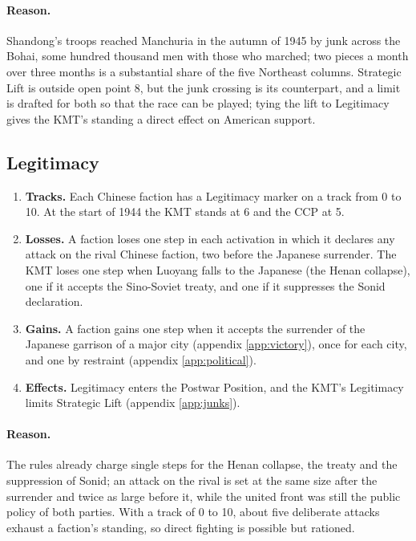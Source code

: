 \documentclass[11pt]{article}
\begin{document}
\paragraph{Reason.} Shandong's troops reached Manchuria in the autumn of 1945 by junk across the Bohai, some hundred thousand men with those who marched; two pieces a month over three months is a substantial share of the five Northeast columns. Strategic Lift is outside open point 8, but the junk crossing is its counterpart, and a limit is drafted for both so that the race can be played; tying the lift to Legitimacy gives the KMT's standing a direct effect on American support.

\subsection{Legitimacy}\label{app:legit}
\draft
\begin{enumerate}
\item \textbf{Tracks.} Each Chinese faction has a Legitimacy marker on a track from 0 to 10. At the start of 1944 the KMT stands at 6 and the CCP at 5.
\item \textbf{Losses.} A faction loses one step in each activation in which it declares any attack on the rival Chinese faction, two before the Japanese surrender. The KMT loses one step when Luoyang falls to the Japanese (the Henan collapse), one if it accepts the Sino-Soviet treaty, and one if it suppresses the Sonid declaration.
\item \textbf{Gains.} A faction gains one step when it accepts the surrender of the Japanese garrison of a major city (appendix \ref{app:victory}), once for each city, and one by restraint (appendix \ref{app:political}).
\item \textbf{Effects.} Legitimacy enters the Postwar Position, and the KMT's Legitimacy limits Strategic Lift (appendix \ref{app:junks}).
\end{enumerate}
\paragraph{Reason.} The rules already charge single steps for the Henan collapse, the treaty and the suppression of Sonid; an attack on the rival is set at the same size after the surrender and twice as large before it, while the united front was still the public policy of both parties. With a track of 0 to 10, about five deliberate attacks exhaust a faction's standing, so direct fighting is possible but rationed.
\end{document}
